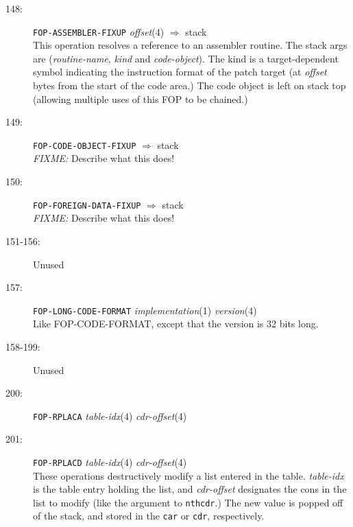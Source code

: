 \begin{description}
\item[148:] \hspace{2em} {\tt FOP-ASSEMBLER-FIXUP} \hspace{2em} {\it offset}(4)
\hspace{2em} $\Rightarrow$ \hspace{2em} stack\\
This operation resolves a reference to an assembler routine.  The stack args
are ({\it routine-name}, {\it kind} and {\it code-object}).  The kind is a
target-dependent symbol indicating the instruction format of the patch target
(at {\it offset} bytes from the start of the code area.)  The code object is
left on stack top (allowing multiple uses of this FOP to be chained.)

\item[149:] \hspace{2em} {\tt FOP-CODE-OBJECT-FIXUP} 
\hspace{2em} $\Rightarrow$ \hspace{2em} stack\\
{\it FIXME:} Describe what this does!

\item[150:] \hspace{2em} {\tt FOP-FOREIGN-DATA-FIXUP} 
\hspace{2em} $\Rightarrow$ \hspace{2em} stack\\
{\it FIXME:} Describe what this does!

\item[151-156:] Unused

\item[157:] \hspace{2em} {\tt FOP-LONG-CODE-FORMAT} \hspace{2em} {\it implementation}(1)
\hspace{2em} {\it version}(4) \\
Like FOP-CODE-FORMAT, except that the version is 32 bits long.

\item[158-199:] Unused

\item[200:] \hspace{2em} {\tt FOP-RPLACA} \hspace{2em} {\it table-idx}(4)
\hspace{2em} {\it cdr-offset}(4)\\

\item[201:] \hspace{2em} {\tt FOP-RPLACD} \hspace{2em} {\it table-idx}(4)
\hspace{2em} {\it cdr-offset}(4)\\
These operations destructively modify a list entered in the table.  {\it
table-idx} is the table entry holding the list, and {\it cdr-offset} designates
the cons in the list to modify (like the argument to {\tt nthcdr}.)  The new
value is popped off of the stack, and stored in the {\tt car} or {\tt cdr},
respectively.


\end{description}
